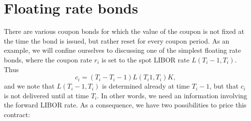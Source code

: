 \section{Floating rate bonds}
There are various coupon bonds for which the value of the coupon is not fixed at the time the bond is issued, but rather reset for every coupon period. As an example, we will confine ourselves to discussing one of the simplest floating rate bonds, where the coupon rate $r_i$ is set to the spot LIBOR rate $L(T_i-1,T_i)$. Thus
\begin{equation*}
    c_i = (T_i - T_i-1)L(T_i1, T_i)K,
\end{equation*}
and we note that $L(T_i-1,T_i)$ is determined already at time $T_i-1$, but that $c_i$ is not delivered until at time $T_i$. In other words, we need an information involving the forward LIBOR rate. As a consequence, we have two possibilities to price this contract:
